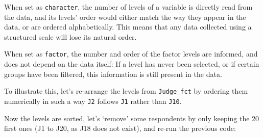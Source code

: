 \documentclass[
]{book}
\newenvironment{Shaded}{\begin{snugshade}}{\end{snugshade}}
\newcommand{\AttributeTok}[1]{\textcolor[rgb]{0.77,0.63,0.00}{#1}}
\newcommand{\ConstantTok}[1]{\textcolor[rgb]{0.00,0.00,0.00}{#1}}
\newcommand{\DecValTok}[1]{\textcolor[rgb]{0.00,0.00,0.81}{#1}}
\newcommand{\FunctionTok}[1]{\textcolor[rgb]{0.00,0.00,0.00}{#1}}
\newcommand{\NormalTok}[1]{#1}
\newcommand{\OtherTok}[1]{\textcolor[rgb]{0.56,0.35,0.01}{#1}}
\newcommand{\SpecialCharTok}[1]{\textcolor[rgb]{0.00,0.00,0.00}{#1}}
\newcommand{\StringTok}[1]{\textcolor[rgb]{0.31,0.60,0.02}{#1}}
\begin{document}
When set as \texttt{character}, the number of levels of a variable is directly read from the data, and its levels' order would either match the way they appear in the data, or are ordered alphabetically. This means that any data collected using a structured scale will lose its natural order.

When set as \texttt{factor}, the number and order of the factor levels are informed, and does not depend on the data itself: If a level has never been selected, or if certain groups have been filtered, this information is still present in the data.

To illustrate this, let's re-arrange the levels from \texttt{Judge\_fct} by ordering them numerically in such a way \texttt{J2} follows \texttt{J1} rather than \texttt{J10}.

\begin{Shaded}
\end{Shaded}

Now the levels are sorted, let's `remove' some respondents by only keeping the 20 first ones (J1 to J20, as J18 does not exist), and re-run the previous code:

\begin{Shaded}
\end{Shaded}
\end{document}
